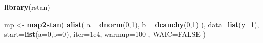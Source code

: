 \documentclass[]{article}
\newenvironment{Shaded}{\begin{snugshade}}{\end{snugshade}}
\newcommand{\KeywordTok}[1]{\textcolor[rgb]{0.13,0.29,0.53}{\textbf{#1}}}
\newcommand{\DataTypeTok}[1]{\textcolor[rgb]{0.13,0.29,0.53}{#1}}
\newcommand{\DecValTok}[1]{\textcolor[rgb]{0.00,0.00,0.81}{#1}}
\newcommand{\FloatTok}[1]{\textcolor[rgb]{0.00,0.00,0.81}{#1}}
\newcommand{\StringTok}[1]{\textcolor[rgb]{0.31,0.60,0.02}{#1}}
\newcommand{\OtherTok}[1]{\textcolor[rgb]{0.56,0.35,0.01}{#1}}
\newcommand{\OperatorTok}[1]{\textcolor[rgb]{0.81,0.36,0.00}{\textbf{#1}}}
\newcommand{\NormalTok}[1]{#1}
\begin{document}
\begin{Shaded}
\begin{Highlighting}[]
\KeywordTok{library}\NormalTok{(rstan)}

\NormalTok{mp <-}\StringTok{ }\KeywordTok{map2stan}\NormalTok{(}
    \KeywordTok{alist}\NormalTok{(}
\NormalTok{        a }\OperatorTok{~}\StringTok{ }\KeywordTok{dnorm}\NormalTok{(}\DecValTok{0}\NormalTok{,}\DecValTok{1}\NormalTok{),}
\NormalTok{        b }\OperatorTok{~}\StringTok{ }\KeywordTok{dcauchy}\NormalTok{(}\DecValTok{0}\NormalTok{,}\DecValTok{1}\NormalTok{)}
\NormalTok{    ),}
    \DataTypeTok{data=}\KeywordTok{list}\NormalTok{(}\DataTypeTok{y=}\DecValTok{1}\NormalTok{),}
    \DataTypeTok{start=}\KeywordTok{list}\NormalTok{(}\DataTypeTok{a=}\DecValTok{0}\NormalTok{,}\DataTypeTok{b=}\DecValTok{0}\NormalTok{),}
    \DataTypeTok{iter=}\FloatTok{1e4}\NormalTok{, }\DataTypeTok{warmup=}\DecValTok{100}\NormalTok{ , }\DataTypeTok{WAIC=}\OtherTok{FALSE}\NormalTok{ )}
\end{Highlighting}
\end{Shaded}
\end{document}
